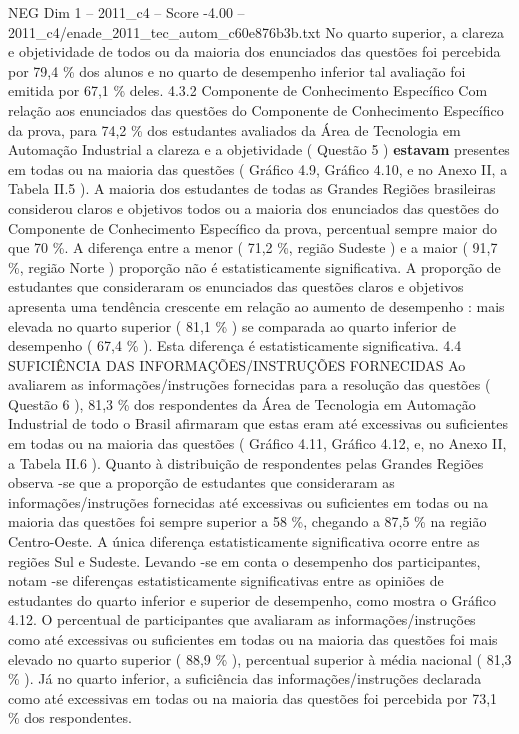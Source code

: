 \begin{textsample}{NEG Dim 1 – 2011\_c4 – Score -4.00 – 2011\_c4/enade\_2011\_tec\_autom\_c60e876b3b.txt}
No quarto superior, a clareza e objetividade de todos ou da maioria dos enunciados das questões foi percebida por 79,4 \% dos alunos e no quarto de desempenho inferior tal avaliação foi emitida por 67,1 \% deles. 4.3.2 Componente de Conhecimento Específico Com relação aos enunciados das questões do Componente de Conhecimento Específico da prova, para 74,2 \% dos estudantes avaliados da Área de Tecnologia em Automação Industrial a clareza e a objetividade ( Questão 5 ) \textbf{estavam} presentes em todas ou na maioria das questões ( Gráfico 4.9, Gráfico 4.10, e no Anexo II, a Tabela II.5 ).
A maioria dos estudantes de todas as Grandes Regiões brasileiras considerou claros e objetivos todos ou a maioria dos enunciados das questões do Componente de Conhecimento Específico da prova, percentual sempre maior do que 70 \%.
A diferença entre a menor ( 71,2 \%, região Sudeste ) e a maior ( 91,7 \%, região Norte ) proporção não é estatisticamente significativa.
A proporção de estudantes que consideraram os enunciados das questões claros e objetivos apresenta uma tendência crescente em relação ao aumento de desempenho : mais elevada no quarto superior ( 81,1 \% ) se comparada ao quarto inferior de desempenho ( 67,4 \% ).
Esta diferença é estatisticamente significativa. 4.4 SUFICIÊNCIA DAS INFORMAÇÕES/INSTRUÇÕES FORNECIDAS Ao avaliarem as informações/instruções fornecidas para a resolução das questões ( Questão 6 ), 81,3 \% dos respondentes da Área de Tecnologia em Automação Industrial de todo o Brasil afirmaram que estas eram até excessivas ou suficientes em todas ou na maioria das questões ( Gráfico 4.11, Gráfico 4.12, e, no Anexo II, a Tabela II.6 ).
Quanto à distribuição de respondentes pelas Grandes Regiões observa -se que a proporção de estudantes que consideraram as informações/instruções fornecidas até excessivas ou suficientes em todas ou na maioria das questões foi sempre superior a 58 \%, chegando a 87,5 \% na região Centro-Oeste.
A única diferença estatisticamente significativa ocorre entre as regiões Sul e Sudeste.
Levando -se em conta o desempenho dos participantes, notam -se diferenças estatisticamente significativas entre as opiniões de estudantes do quarto inferior e superior de desempenho, como mostra o Gráfico 4.12.
O percentual de participantes que avaliaram as informações/instruções como até excessivas ou suficientes em todas ou na maioria das questões foi mais elevado no quarto superior ( 88,9 \% ), percentual superior à média nacional ( 81,3 \% ).
Já no quarto inferior, a suficiência das informações/instruções declarada como até excessivas em todas ou na maioria das questões foi percebida por 73,1 \% dos respondentes.

\end{textsample}
